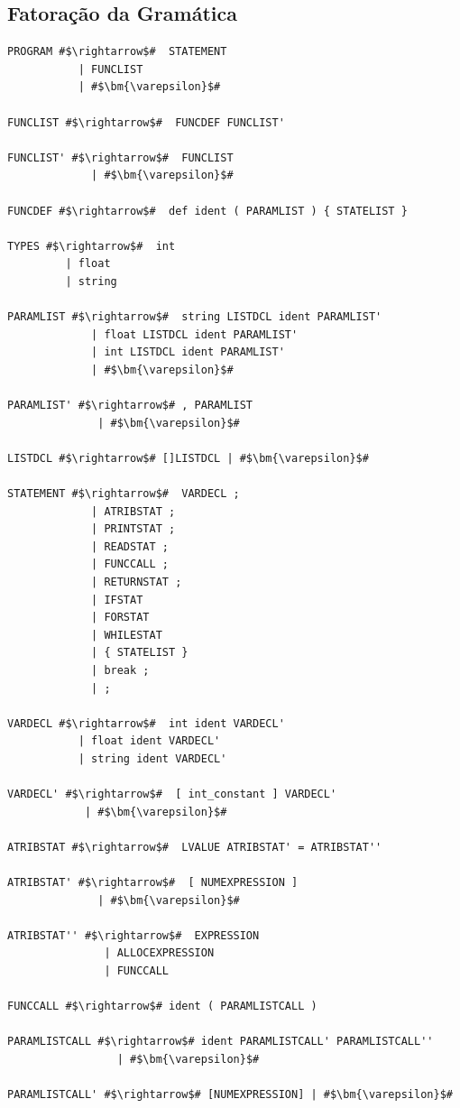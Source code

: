 \documentclass[
	12pt,				%
	openright,			%
	twoside,			%
	a4paper,			%
	english,			%
	french,				%
	spanish,			%
	brazil				%
	]{abntex2}
\begin{document}
\subsection{Fatoração da Gramática}
\begin{lstlisting}[escapechar=\#]
PROGRAM #$\rightarrow$#  STATEMENT 
           | FUNCLIST 
           | #$\bm{\varepsilon}$# 

FUNCLIST #$\rightarrow$#  FUNCDEF FUNCLIST' 

FUNCLIST' #$\rightarrow$#  FUNCLIST 
             | #$\bm{\varepsilon}$# 

FUNCDEF #$\rightarrow$#  def ident ( PARAMLIST ) { STATELIST } 

TYPES #$\rightarrow$#  int 
         | float 
         | string 

PARAMLIST #$\rightarrow$#  string LISTDCL ident PARAMLIST' 
             | float LISTDCL ident PARAMLIST' 
             | int LISTDCL ident PARAMLIST' 
             | #$\bm{\varepsilon}$# 

PARAMLIST' #$\rightarrow$# , PARAMLIST 
              | #$\bm{\varepsilon}$# 

LISTDCL #$\rightarrow$# []LISTDCL | #$\bm{\varepsilon}$# 

STATEMENT #$\rightarrow$#  VARDECL ; 
             | ATRIBSTAT ; 
             | PRINTSTAT ; 
             | READSTAT ; 
             | FUNCCALL ; 
             | RETURNSTAT ; 
             | IFSTAT 
             | FORSTAT 
             | WHILESTAT 
             | { STATELIST } 
             | break ; 
             | ; 

VARDECL #$\rightarrow$#  int ident VARDECL' 
           | float ident VARDECL' 
           | string ident VARDECL' 

VARDECL' #$\rightarrow$#  [ int_constant ] VARDECL' 
            | #$\bm{\varepsilon}$# 

ATRIBSTAT #$\rightarrow$#  LVALUE ATRIBSTAT' = ATRIBSTAT'' 

ATRIBSTAT' #$\rightarrow$#  [ NUMEXPRESSION ] 
              | #$\bm{\varepsilon}$# 

ATRIBSTAT'' #$\rightarrow$#  EXPRESSION 
               | ALLOCEXPRESSION 
               | FUNCCALL 

FUNCCALL #$\rightarrow$# ident ( PARAMLISTCALL ) 

PARAMLISTCALL #$\rightarrow$# ident PARAMLISTCALL' PARAMLISTCALL''
                 | #$\bm{\varepsilon}$# 

PARAMLISTCALL' #$\rightarrow$# [NUMEXPRESSION] | #$\bm{\varepsilon}$#                  


\end{lstlisting}
\end{document}
